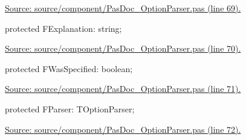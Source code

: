\documentclass{report}
\newif\ifpdf
\begin{document}
\begin{list}{}
\begin{flushleft}
\ifpdf
\end{flushleft}
\fi


\par  \par
\href{https://github.com/pasdoc/pasdoc/blob/master/source/component/PasDoc_OptionParser.pas#L69}{Source: source/component/PasDoc{\_}OptionParser.pas (line 69).}\label{PasDoc_OptionParser.TOption-FExplanation}
\item[\textbf{FExplanation}\hfill]
\ifpdf
\begin{flushleft}
\fi
\begin{ttfamily}
protected FExplanation: string;\end{ttfamily}

\ifpdf
\end{flushleft}
\fi


\par  \par
\href{https://github.com/pasdoc/pasdoc/blob/master/source/component/PasDoc_OptionParser.pas#L70}{Source: source/component/PasDoc{\_}OptionParser.pas (line 70).}\label{PasDoc_OptionParser.TOption-FWasSpecified}
\item[\textbf{FWasSpecified}\hfill]
\ifpdf
\begin{flushleft}
\fi
\begin{ttfamily}
protected FWasSpecified: boolean;\end{ttfamily}

\ifpdf
\end{flushleft}
\fi


\par  \par
\href{https://github.com/pasdoc/pasdoc/blob/master/source/component/PasDoc_OptionParser.pas#L71}{Source: source/component/PasDoc{\_}OptionParser.pas (line 71).}\label{PasDoc_OptionParser.TOption-FParser}
\item[\textbf{FParser}\hfill]
\ifpdf
\begin{flushleft}
\fi
\begin{ttfamily}
protected FParser: TOptionParser;\end{ttfamily}

\ifpdf
\end{flushleft}
\fi


\par  \par
\href{https://github.com/pasdoc/pasdoc/blob/master/source/component/PasDoc_OptionParser.pas#L72}{Source: source/component/PasDoc{\_}OptionParser.pas (line 72).}\end{list}
\end{document}
